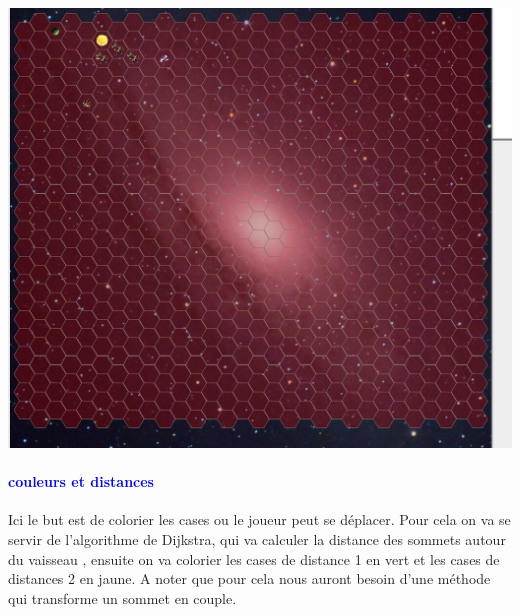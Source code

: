 \documentclass{report}
\begin{document}
      \begin{center}  
          \includegraphics[scale=0.30]{Images/effaceColoration.png}
      \end{center} 
       
       
      \paragraph{\textcolor{blue} {couleurs et distances}} 
      Ici le but est de colorier les cases ou le joueur peut se déplacer. 
      Pour cela on va  se servir de l'algorithme de Dijkstra, qui va calculer la distance des sommets autour du vaisseau , ensuite on va colorier les cases de distance 1 en vert et les cases de distances 2 en jaune. A noter que pour cela nous auront besoin d'une méthode qui transforme un sommet en couple. 
       
         
       
      
\end{document}
